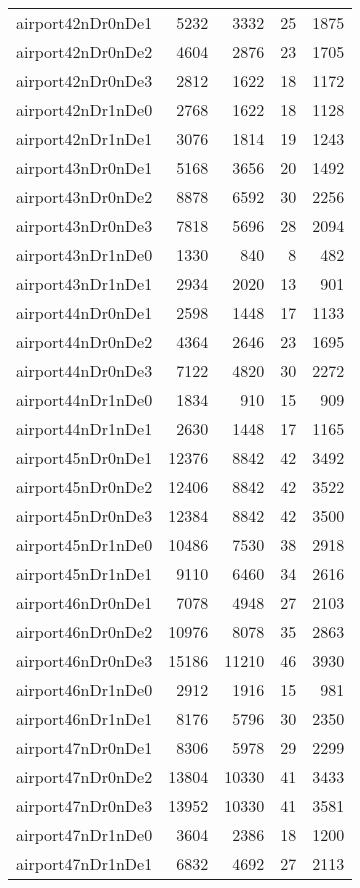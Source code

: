 \begin{longtable}{lrrrr}
airport42nDr0nDe1 & 5232 & 3332 & 25 & 1875 \\
airport42nDr0nDe2 & 4604 & 2876 & 23 & 1705 \\
airport42nDr0nDe3 & 2812 & 1622 & 18 & 1172 \\
airport42nDr1nDe0 & 2768 & 1622 & 18 & 1128 \\
airport42nDr1nDe1 & 3076 & 1814 & 19 & 1243 \\
airport43nDr0nDe1 & 5168 & 3656 & 20 & 1492 \\
airport43nDr0nDe2 & 8878 & 6592 & 30 & 2256 \\
airport43nDr0nDe3 & 7818 & 5696 & 28 & 2094 \\
airport43nDr1nDe0 & 1330 & 840 & 8 & 482 \\
airport43nDr1nDe1 & 2934 & 2020 & 13 & 901 \\
airport44nDr0nDe1 & 2598 & 1448 & 17 & 1133 \\
airport44nDr0nDe2 & 4364 & 2646 & 23 & 1695 \\
airport44nDr0nDe3 & 7122 & 4820 & 30 & 2272 \\
airport44nDr1nDe0 & 1834 & 910 & 15 & 909 \\
airport44nDr1nDe1 & 2630 & 1448 & 17 & 1165 \\
airport45nDr0nDe1 & 12376 & 8842 & 42 & 3492 \\
airport45nDr0nDe2 & 12406 & 8842 & 42 & 3522 \\
airport45nDr0nDe3 & 12384 & 8842 & 42 & 3500 \\
airport45nDr1nDe0 & 10486 & 7530 & 38 & 2918 \\
airport45nDr1nDe1 & 9110 & 6460 & 34 & 2616 \\
airport46nDr0nDe1 & 7078 & 4948 & 27 & 2103 \\
airport46nDr0nDe2 & 10976 & 8078 & 35 & 2863 \\
airport46nDr0nDe3 & 15186 & 11210 & 46 & 3930 \\
airport46nDr1nDe0 & 2912 & 1916 & 15 & 981 \\
airport46nDr1nDe1 & 8176 & 5796 & 30 & 2350 \\
airport47nDr0nDe1 & 8306 & 5978 & 29 & 2299 \\
airport47nDr0nDe2 & 13804 & 10330 & 41 & 3433 \\
airport47nDr0nDe3 & 13952 & 10330 & 41 & 3581 \\
airport47nDr1nDe0 & 3604 & 2386 & 18 & 1200 \\
airport47nDr1nDe1 & 6832 & 4692 & 27 & 2113 \\

\end{longtable}
